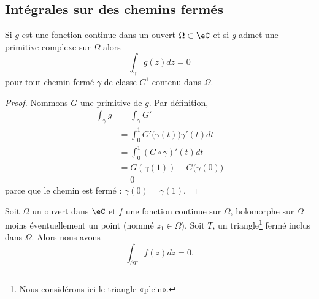 \subsection{Intégrales sur des chemins fermés}

\begin{lemma}       \label{LemtpEOmi}
	Si \( g\) est une fonction continue dans un ouvert \( \Omega\subset \eC\) et si \( g\) admet une primitive complexe sur \( \Omega\) alors
	\begin{equation}
		\int_{\gamma}g(z)dz=0
	\end{equation}
	pour tout chemin fermé \( \gamma\) de classe \( C^1\) contenu dans \( \Omega\).
\end{lemma}

\begin{proof}
	Nommons \( G\) une primitive de \( g\). Par définition,
	\begin{subequations}
		\begin{align}
			\int_{\gamma}g & =\int_{\gamma}G'                             \\
			               & =\int_0^1G'\big( \gamma(t) \big)\gamma'(t)dt \\
			               & =\int_0^1 (G\circ \gamma)'(t)dt              \\
			               & =G(\gamma(1))-G\big( \gamma(0) \big)         \\
			               & =0
		\end{align}
	\end{subequations}
	parce que le chemin est fermé : \( \gamma(0)=\gamma(1)\).
\end{proof}

\begin{lemma}  \label{LemwbwbUR}
	Soit \( \Omega\) un ouvert dans \( \eC\) et \( f\) une fonction continue sur \( \Omega\), holomorphe sur \( \Omega\) moins éventuellement un point (nommé \( z_1\in\Omega\)). Soit \( T\), un triangle\footnote{Nous considérons ici le triangle «plein».} fermé inclus dans \( \Omega\). Alors nous avons
	\begin{equation}
		\int_{\partial T}f(z)dz=0.
	\end{equation}
\end{lemma}

